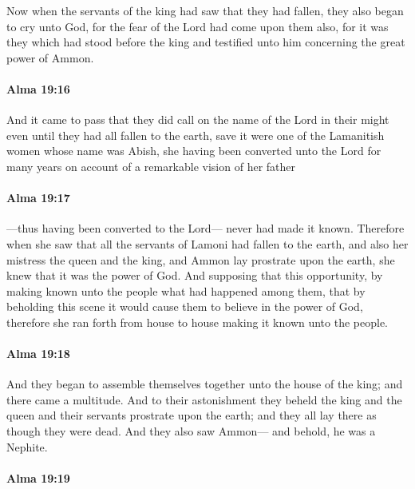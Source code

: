 			Now when the servants of the king had saw that they had fallen,
			they also began to cry unto God,
			for the fear of the Lord had come upon them also,
			for it was they which had stood before the king
			and testified unto him concerning the great power of Ammon.

		\paragraph{Alma 19:16} %
			\label{ALMA-19-16}

			And it came to pass that they did call on the name of the Lord in their might
			even until they had all fallen to the earth,
			save it were one of the Lamanitish women whose name was Abish,
			she having been converted unto the Lord for many years
			on account of a remarkable vision of her father

		\paragraph{Alma 19:17} %
			\label{ALMA-19-17}

			---thus having been converted to the Lord---
			never had made it known.
			Therefore when she saw
			that all the servants of Lamoni had fallen to the earth,
			and also her mistress the queen and the king,
			and Ammon lay prostrate upon the earth,
			she knew that it was the power of God.
			And supposing that this opportunity,
			by making known unto the people what had happened among them,
			that by beholding this scene
			it would cause them to believe in the power of God,
			therefore she ran forth from house to house making it known unto the people.

		\paragraph{Alma 19:18} %
			\label{ALMA-19-18}

			And they began to assemble themselves together unto the house of the king;
			and there came a multitude.
			And to their astonishment they beheld
			the king and the queen and their servants prostrate upon the earth;
			and they all lay there as though they were dead.
			And they also saw Ammon---
			and behold, he was a Nephite.

		\paragraph{Alma 19:19} %
			\label{ALMA-19-19}

